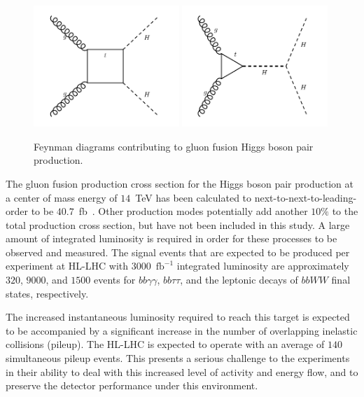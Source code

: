 \begin{figure}[hbtp]
  \begin{center}
    \includegraphics[width=0.49\textwidth]{figures_chapter6/hhbox.pdf}
    \includegraphics[width=0.49\textwidth]{figures_chapter6/hhself.pdf}       
    \caption{Feynman diagrams contributing to gluon fusion Higgs boson pair production.}
    \label{fig:feynman}
  \end{center}
\end{figure}

The gluon fusion production cross section for the Higgs boson pair production at a center of mass energy of $14$~TeV has been calculated to next-to-next-to-leading-order to be $40.7$~fb~\cite{Dawson:1998py,Grigo:2014jma}. Other production modes potentially add another $10\%$ to the total production cross section, but have not been included in this study. A large amount of integrated luminosity is required in order for these processes to be observed and measured. The signal events that are expected to be produced per experiment at HL-LHC with $3000$~$\mathrm{fb}^{-1}$ integrated luminosity are approximately $320$, $9000$, and $1500$ events for $bb\gamma\gamma$, $bb\tau\tau$, and the leptonic decays of $bbWW$ final states, respectively.

The increased instantaneous luminosity required to reach this target is expected to be accompanied by a significant increase in the number of overlapping inelastic collisions (pileup). The HL-LHC is expected to operate with an average of $140$ simultaneous pileup events. This presents a serious challenge to the experiments in their ability to deal with this increased level of activity and energy flow, and to preserve the detector performance under this environment. 

